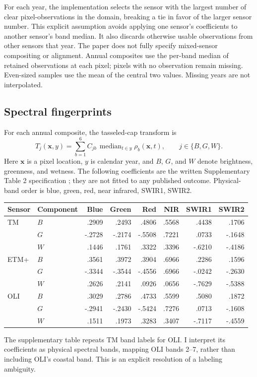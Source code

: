 \documentclass[11pt]{article}
\begin{document}
For each year, the implementation selects the sensor with the largest number
of clear pixel-observations in the domain, breaking a tie in favor of the
larger sensor number. This explicit assumption avoids applying one sensor's
coefficients to another sensor's band median. It also discards otherwise
usable observations from other sensors that year. The paper does not fully
specify mixed-sensor compositing or alignment. Annual composites use the
per-band median of retained observations at each pixel; pixels with no
observation remain missing. Even-sized samples use the mean of the central
two values. Missing years are not interpolated.

\subsection{Spectral fingerprints}
For each annual composite, the tasseled-cap transform is
\begin{equation}
 T_j(\mathbf{x},y)=\sum_{b=1}^{6} C_{jb}\,
             \operatorname{median}_{t\in y}\rho_b(\mathbf{x},t),
 \qquad j\in\{B,G,W\}.
\end{equation}
Here $\mathbf{x}$ is a pixel location, $y$ is calendar year, and $B$, $G$,
and $W$ denote brightness, greenness, and wetness. The following coefficients
are the written Supplementary Table 2 specification \cite{supp}; they are
not fitted to any published outcome. Physical-band order is blue, green,
red, near infrared, SWIR1, SWIR2.

\begin{center}\small
\begin{tabular}{llrrrrrr}\toprule
Sensor & Component & Blue & Green & Red & NIR & SWIR1 & SWIR2\\\midrule
TM & $B$ & .2909 & .2493 & .4806 & .5568 & .4438 & .1706\\
 & $G$ & -.2728 & -.2174 & -.5508 & .7221 & .0733 & -.1648\\
 & $W$ & .1446 & .1761 & .3322 & .3396 & -.6210 & -.4186\\
ETM+ & $B$ & .3561 & .3972 & .3904 & .6966 & .2286 & .1596\\
 & $G$ & -.3344 & -.3544 & -.4556 & .6966 & -.0242 & -.2630\\
 & $W$ & .2626 & .2141 & .0926 & .0656 & -.7629 & -.5388\\
OLI & $B$ & .3029 & .2786 & .4733 & .5599 & .5080 & .1872\\
 & $G$ & -.2941 & -.2430 & -.5424 & .7276 & .0713 & -.1608\\
 & $W$ & .1511 & .1973 & .3283 & .3407 & -.7117 & -.4559\\\bottomrule
\end{tabular}
\end{center}
The supplementary table repeats TM band labels for OLI. I interpret its
coefficients as physical spectral bands, mapping OLI bands 2--7, rather than
including OLI's coastal band. This is an explicit resolution of a labeling
ambiguity.
\end{document}
